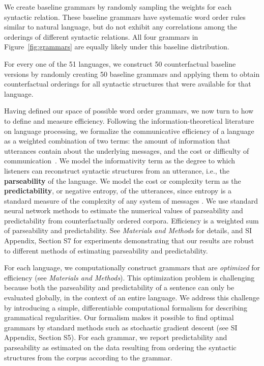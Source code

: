 \documentclass[9pt,twocolumn,twoside,lineno]{pnas-new}
\newcommand{\key}[1]{\textbf{#1}}
\begin{document}
We create baseline grammars by randomly sampling the weights for each syntactic relation.
These baseline grammars have systematic word order rules similar to natural language, but do not exhibit any correlations among the orderings of different syntactic relations.
All four grammars in Figure~\ref{fig:grammars} are equally likely under this baseline distribution.

For every one of the 51 languages, we construct 50 counterfactual baseline versions by randomly creating 50 baseline grammars and applying them to obtain counterfactual orderings for all syntactic structures that were available for that language.

Having defined our space of possible word order grammars, we now turn to how to define and measure efficiency. 
Following the information-theoretical literature on language processing, 
we formalize the communicative efficiency of a language as a weighted combination of two terms:  the 
amount of information that utterances contain about the underlying messages, and the  cost or difficulty of communication~\cite{ferreri2003least,frank2012predicting,zaslavsky2018efficient,kemp2012kinship,regier2015word,goodman2013knowledge}.
We model the informativity term as the 
degree to which listeners can reconstruct syntactic structures from an utterance, i.e., the \key{parseability} of the language. We model the cost or complexity term as the 
\key{predictability}, or negative entropy, of the utterances, since entropy is a standard measure of the complexity of any system of messages \cite{shannon1948mathematical}.
We use standard neural network methods to estimate the numerical values of parseability and predictability from counterfactually ordered corpora.
Efficiency is a weighted sum of parseability and predictability.
See \textit{Materials and Methods} for details, and SI Appendix, Section S7 for experiments demonstrating that our results are robust to different methods of estimating parseability and predictability.

For each language, we computationally construct grammars that are \emph{optimized} for efficiency (see \textit{Materials and Methods}).
This optimization problem is challenging because both the parseability and predictability of a sentence can only be evaluated globally, in the context of an entire language.
We address this challenge by introducing a simple, differentiable computational formalism for describing grammatical regularities. 
Our formalism makes it possible to find optimal grammars by standard methods such as stochastic gradient descent (see SI Appendix, Section S5).
For each grammar, we report predictability and parseability as estimated on the data resulting from ordering the syntactic structures from the corpus according to the grammar.
\end{document}
